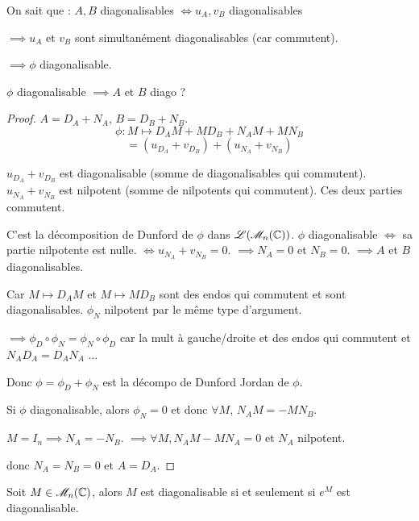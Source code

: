 On sait que : $A, B$ diagonalisables $\iff u_A, v_B$ diagonalisables

$\implies u_A$ et $v_B$ sont simultanément diagonalisables (car commutent).

$\implies \phi$ diagonalisable.

\avspace 
$\phi$ diagonalisable $\implies A$ et $B$ diago ?

\begin{proof}
    
$A = D_A + N_A$, $B = D_B + N_B$.
\[ \phi : M \mapsto D_A M + M D_B + N_A M + M N_B \]
\[ = (u_{D_A} + v_{D_B}) + (u_{N_A} + v_{N_B}) \]

$u_{D_A} + v_{D_B}$ est diagonalisable (somme de diagonalisables qui commutent).
$u_{N_A} + v_{N_B}$ est nilpotent (somme de nilpotents qui commutent).
Ces deux parties commutent.

C'est la décomposition de Dunford de $\phi$ dans $\mathscr L(\mathscr M_n(\mathbb{C}))$.
$\phi$ diagonalisable $\iff$ sa partie nilpotente est nulle.
$\iff u_{N_A} + v_{N_B} = 0$.
$\implies N_A = 0$ et $N_B = 0$.
$\implies A$ et $B$ diagonalisables.


Car $M \mapsto D_A M$ et $M \mapsto M D_B$ sont des endos qui commutent
et sont diagonalisables.
$\phi_N$ nilpotent par le même type d'argument.

$\implies \phi_D \circ \phi_N = \phi_N \circ \phi_D$ car la mult à gauche/droite et
des endos qui commutent et $N_A D_A = D_A N_A$ ...

Donc $\phi = \phi_D + \phi_N$ est la décompo de Dunford Jordan de $\phi$.

Si $\phi$ diagonalisable, alors $\phi_N = 0$ et donc
$\forall M, \, N_A M = -M N_B$.

$M = I_n \implies N_A = -N_B$.
$\implies \forall M, N_A M - M N_A = 0$ et $N_A$ nilpotent.

donc $N_A = N_B = 0$ et $A = D_A$.

\end{proof} 
\lvspace
{}

\begin{theoreme}{}{}
    Soit $M \in \mathscr M_n(\mathbb{C})$, alors $M$ est diagonalisable
    si et seulement si $e^M$ est diagonalisable.
\end{theoreme}

